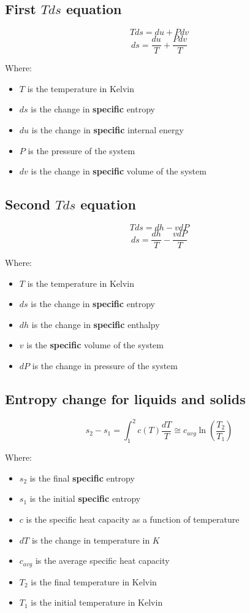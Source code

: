 \documentclass[11pt]{article}
\begin{document}
 \newpage
\subsection{First \(Tds\) equation}
\label{sec:orgfbec95e}
\[T ds = du + P dv\]
\[ds = \frac{du}{T} + \frac{P dv}{T}\]

Where:
\begin{itemize}
\item \(T\) is the temperature in Kelvin
\item \(ds\) is the change in \textbf{specific} entropy
\item \(du\) is the change in \textbf{specific} internal energy
\item \(P\) is the pressure of the system
\item \(dv\) is the change in \textbf{specific} volume of the system
\end{itemize}
\subsection{Second \(Tds\) equation}
\label{sec:org682fd5b}
\[T ds = dh - v dP\]
\[ds = \frac{dh}{T} - \frac{v dP}{T}\]

Where:
\begin{itemize}
\item \(T\) is the temperature in Kelvin
\item \(ds\) is the change in \textbf{specific} entropy
\item \(dh\) is the change in \textbf{specific} enthalpy
\item \(v\) is the \textbf{specific} volume of the system
\item \(dP\) is the change in pressure of the system
\end{itemize}

 \newpage
\subsection{Entropy change for liquids and solids}
\label{sec:orgf553311}
\[s_2 - s_1 = \int_1^2 c(T) \frac{dT}{T} \cong c_{avg} \ln \left( \frac{T_2}{T_1} \right)\]

Where:
\begin{itemize}
\item \(s_2\) is the final \textbf{specific} entropy
\item \(s_1\) is the initial \textbf{specific} entropy
\item \(c\) is the specific heat capacity as a function of temperature
\item \(dT\) is the change in temperature in \(\unit{K}\)
\item \(c_{avg}\) is the average specific heat capacity
\item \(T_2\) is the final temperature in Kelvin
\item \(T_1\) is the initial temperature in Kelvin
\end{itemize}
\end{document}
